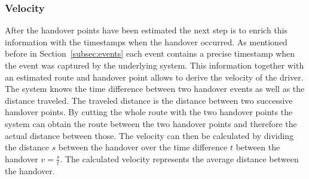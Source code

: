 \documentclass[master,english]{hgbthesis}
\begin{document}
\subsubsection{Velocity}
\label{sec:velocity}
After the handover points have been estimated the next step is to enrich this information with the timestamps when the handover occurred. As mentioned before in Section~\ref{subsec:events} each event contains a precise timestamp when the event was captured by the underlying system. This information together with an estimated route and handover point allows to derive the velocity of the driver. The system knows the time difference between two handover events as well as the distance traveled. The traveled distance is the distance between two successive handover points. By cutting the whole route with the two handover points the system can obtain the route between the two handover points and therefore the actual distance between those. The velocity can then be calculated  by dividing the distance $s$ between the handover over the time difference $t$ between the handover $v=\frac{s}{t}$. The calculated velocity represents the average distance between the handover.
\end{document}
